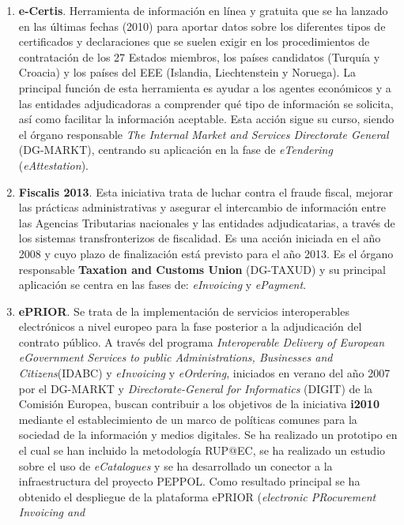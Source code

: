 \begin{enumerate}
 \item \textbf{e-Certis}. Herramienta de información en línea y gratuita que
se ha lanzado en las últimas fechas (2010) para aportar datos sobre los
diferentes tipos de certificados y declaraciones que se suelen exigir
en los procedimientos de contratación de los 27 \gls{Estados} miembros, los países
candidatos (Turquía y Croacia) y los países del \gls{EEE} (Islandia, Liechtenstein y Noruega). 
La principal función de esta herramienta es ayudar a los agentes económicos y a las
entidades adjudicadoras a comprender qué tipo de información se solicita, así como facilitar
la información aceptable. Esta acción sigue su curso, siendo el órgano responsable
\textit{The Internal Market and Services Directorate General} (\gls{DG-MARKT}), centrando su aplicación 
en la fase de \textit{eTendering} (\textit{eAttestation}).
\item \textbf{Fiscalis 2013}. Esta iniciativa trata de luchar contra el fraude
fiscal, mejorar las prácticas administrativas y asegurar el intercambio de información
entre las Agencias Tributarias nacionales y las entidades adjudicatarias, a través
de los sistemas transfronterizos de fiscalidad. Es una acción iniciada en el año 2008
y cuyo plazo de finalización está previsto para el año 2013. Es el órgano responsable \textbf{Taxation and Customs Union} (\gls{DG-TAXUD}) y 
su principal aplicación se centra en las fases de: \textit{eInvoicing} y \textit{ePayment}.
\item \textbf{\gls{ePRIOR}}. Se trata de la implementación de servicios interoperables
electrónicos a nivel europeo para la fase posterior a la adjudicación del contrato
público. A través del programa \textit{Interoperable Delivery of European eGovernment Services to public Administrations, Businesses and Citizens}(IDABC) y \textit{eInvoicing} y \textit{eOrdering}, iniciados
en verano del año 2007 por el \gls{DG-MARKT} y \textit{Directorate-General for Informatics} (\gls{DIGIT}) 
de la Comisión Europea, buscan contribuir a los objetivos de la iniciativa \textbf{i2010} mediante el establecimiento
de un marco de políticas comunes para la sociedad de la información y medios digitales. Se ha
realizado un prototipo en el cual se han incluido la metodología RUP@EC, se ha realizado
un estudio sobre el uso de \textit{eCatalogues} y se ha desarrollado un conector
a la infraestructura del proyecto PEPPOL. Como resultado principal se ha obtenido
el despliegue de la plataforma \gls{ePRIOR} (\textit{electronic PRocurement Invoicing and
}
\end{enumerate}
